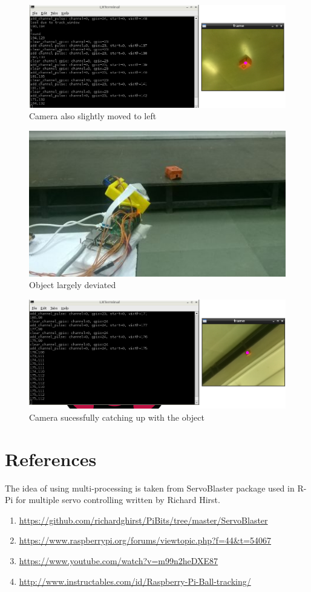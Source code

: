 \documentclass[11pt,a4paper]{article}
\begin{document}
   \begin{figure}[h]
    \includegraphics[scale=0.5]{2.png}
   \centering
 \caption{Camera also slightly moved to left}
  \end{figure}
   \begin{figure}[h]
 \includegraphics[scale=0.5]{s3.jpg}
   \centering
 \caption{Object largely deviated}
  \end{figure}
   \begin{figure}[h]
    \includegraphics[scale=0.5]{3.png}
   \centering
 \caption{Camera sucessfully catching up with the object}
  \end{figure}
	\section{References}
	The idea of using multi-processing is taken from ServoBlaster package used in R-Pi for  multiple servo controlling written by Richard Hirst.
	
	\begin{enumerate}
	\item \url{https://github.com/richardghirst/PiBits/tree/master/ServoBlaster}

     \item \url{https://www.raspberrypi.org/forums/viewtopic.php?f=44&t=54067}
     \item \url{https://www.youtube.com/watch?v=m99n2heDXE87}
      \item \url{http://www.instructables.com/id/Raspberry-Pi-Ball-tracking/}
   \end{enumerate}
	
\end{document}
